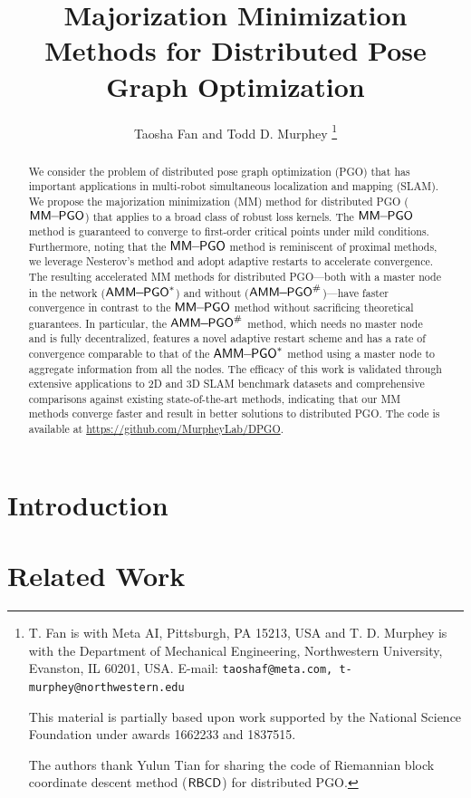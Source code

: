 \documentclass[journal]{IEEEtran}
\title{\LARGE \bf Majorization Minimization Methods for Distributed Pose Graph Optimization}
\author{Taosha Fan and Todd D. Murphey
	\thanks{T. Fan is with Meta AI, Pittsburgh, PA 15213, USA and T. D. Murphey is with the Department of Mechanical Engineering, Northwestern University, Evanston, IL 60201, USA. E-mail: {\tt taoshaf@meta.com, t-murphey@northwestern.edu}
		
		This material is partially based upon work supported by the National Science Foundation under awards 1662233 and 1837515. 
		
		The authors thank Yulun Tian for sharing the code of Riemannian block coordinate descent method ($\mathsf{RBCD}$) for distributed PGO.
	}
}
\def\highlight{}
\begin{document}
	\maketitle
	\thispagestyle{empty}
	\pagestyle{empty}
	
	
	\begin{abstract}
		We consider the problem of distributed pose graph optimization (PGO) that has important applications in multi-robot simultaneous localization and mapping (SLAM). We propose the majorization minimization (MM) method for distributed PGO ($\mathsf{MM\!\!-\!\!PGO}$) that applies to a broad class of robust loss kernels. The $\mathsf{MM\!\!-\!\!PGO}$ method is guaranteed to converge to first-order critical points under mild conditions. Furthermore, noting that the $\mathsf{MM\!\!-\!\!PGO}$ method is reminiscent of {\highlight proximal methods}, we leverage Nesterov's method and adopt adaptive restarts to accelerate convergence. The resulting accelerated MM methods for distributed PGO---both with a master node in the network ($\mathsf{AMM\!\!-\!\!PGO}^*$) and without ($\mathsf{AMM\!\!-\!\!PGO}^{\#}$)---have faster convergence in contrast to the $\mathsf{MM\!\!-\!\!PGO}$ method without sacrificing theoretical guarantees. In particular, the $\mathsf{AMM\!\!-\!\!PGO}^{\#}$ method, which needs no master node and is fully decentralized, features a novel adaptive restart scheme and has a rate of convergence comparable to that of the $\mathsf{AMM\!\!-\!\!PGO}^*$ method using a master node to aggregate information from all the nodes. The efficacy of this work is validated through extensive applications to 2D and 3D SLAM benchmark datasets and comprehensive comparisons against existing state-of-the-art methods, indicating that our MM methods converge faster and result in better solutions to distributed PGO.  The code is available at \url{https://github.com/MurpheyLab/DPGO}.
	\end{abstract}
	
	\vspace{-0.25em}
	\section{Introduction}\label{section::intro}
	
	
	\vspace{-0.25em}
	\section{Related Work}\label{section::work}
	
	
\end{document}

